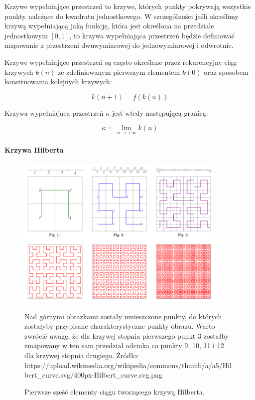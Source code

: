\documentclass[oneside, mag]{mgr}
\begin{document}
Krzywe wypełniające przestrzeń to krzywe, których punkty pokrywają wszystkie punkty należące do kwadratu jednostkowego. W szczególności jeśli określimy krzywą wypełniającą jaką funkcję, która jest określona na przedziale jednostkowym $[0, 1]$, to krzywa wypełniająca przestrzeń będzie definiować mapowanie z przestrzeni dwuwymiarowej do jednowymiarowej i odwrotnie. 

Krzywe wypełniające przestrzeń są często określane przez rekurencyjny ciąg krzywych $k(n)$ ze zdefiniowanym pierwszym elementem $k(0)$ oraz sposobem konstruowania kolejnych krzywych:

\begin{equation}
	k(n+1) = f(k(n))
\end{equation}

Krzywa wypełniająca przestrzeń $\kappa$ jest wtedy następującą granicą:

\begin{equation}
	\kappa = \lim_{n \rightarrow + \infty } k(n)
\end{equation}

\paragraph{Krzywa Hilberta}

\begin{figure}
\centering
	\includegraphics[width=0.9\textwidth]{img/hilbert_curve.png}
	\caption{Pierwsze sześć elementy ciągu tworzącego krzywą Hilberta.} Nad górnymi obrazkami zostały umieszczone punkty, do których zostałyby przypisane charakterystyczne punkty obrazu. Warto zwrócić uwagę, że dla krzywej stopnia pierwszego punkt 3 zostałby zmapowany w ten sam przedział odcinka co punkty 9, 10, 11 i 12 dla krzywej stopnia drugiego. Źródło: https://upload.wikimedia.org/wikipedia/commons/thumb/a/a5/Hilbert\_curve.svg/400px-Hilbert\_curve.svg.png
	\label{fig:hilbert}
\end{figure}
\end{document}
